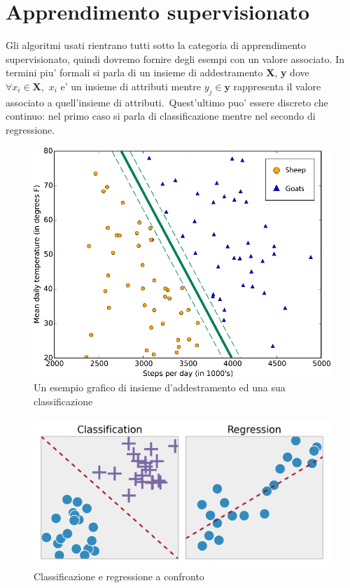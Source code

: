 \section*{Apprendimento supervisionato}
Gli algoritmi usati rientrano tutti sotto la categoria di apprendimento supervisionato, quindi dovremo fornire degli esempi con un valore associato. In termini piu' formali si parla di un insieme di addestramento \textbf{X}, \textbf{y} dove $\forall x_i \in \textbf{X},\,\,x_i$ e' un insieme di attributi mentre $y_j \in \textbf{y}$ rappresenta il valore associato a quell'insieme di attributi.\ Quest'ultimo puo' essere discreto che continuo: nel primo caso si parla di classificazione mentre nel secondo di regressione.\\

\begin{figure}[H]
	\centering
	\includegraphics[width=0.7\linewidth]{img/supervised_learning_example}
	\caption{Un esempio grafico di insieme d'addestramento ed una sua classificazione}
	\label{fig:supervisedlearningexample}
\end{figure}


\begin{figure}[H]
	\centering
	\includegraphics[width=0.7\linewidth]{img/Classification_Regression}
	\caption{Classificazione e regressione a confronto}
	\label{fig:classificationregression}
\end{figure}

